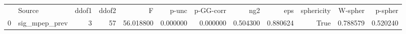 \begin{tabular}{llrrrrrrrrrr}
 & Source & ddof1 & ddof2 & F & p-unc & p-GG-corr & ng2 & eps & sphericity & W-spher & p-spher \\
0 & sig_mpep_prev & 3 & 57 & 56.018800 & 0.000000 & 0.000000 & 0.504300 & 0.880624 & True & 0.788579 & 0.520240 \\
\end{tabular}
